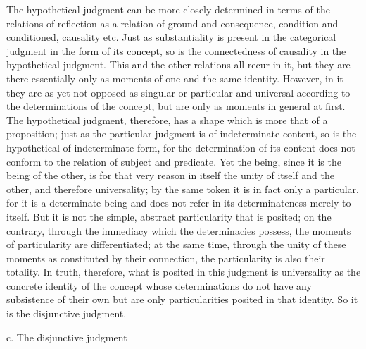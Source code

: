 The hypothetical judgment can be more closely determined
in terms of the relations of reflection as
a relation of ground and consequence,
condition and conditioned, causality etc.
Just as substantiality is present in the
categorical judgment in the form of its concept,
so is the connectedness of causality
in the hypothetical judgment.
This and the other relations all recur in it,
but they are there essentially only as moments of
one and the same identity.
However, in it they are as yet not opposed as
singular or particular and universal
according to the determinations of the concept,
but are only as moments in general at first.
The hypothetical judgment, therefore, has a shape
which is more that of a proposition;
just as the particular judgment is of indeterminate content,
so is the hypothetical of indeterminate form,
for the determination of its content does not conform
to the relation of subject and predicate.
Yet the being, since it is the being of the other,
is for that very reason in itself
the unity of itself and the other,
and therefore universality;
by the same token it is in fact only a particular,
for it is a determinate being
and does not refer in its determinateness merely to itself.
But it is not the simple, abstract particularity that is posited;
on the contrary, through the immediacy
which the determinacies possess,
the moments of particularity are differentiated;
at the same time, through the unity of these moments
as constituted by their connection,
the particularity is also their totality.
In truth, therefore, what is posited in this judgment is
universality as the concrete identity of the concept
whose determinations do not have any subsistence of their own
but are only particularities posited in that identity.
So it is the disjunctive judgment.

c. The disjunctive judgment

